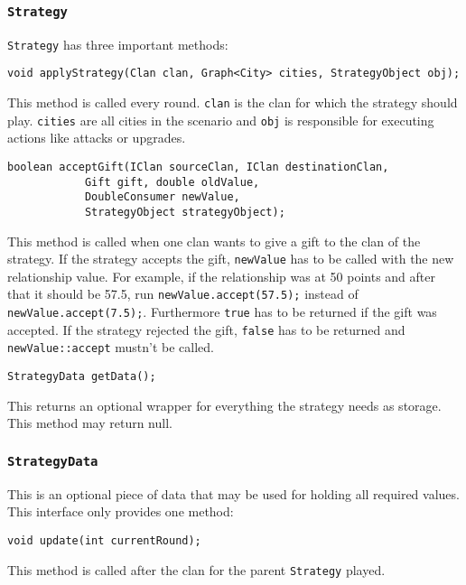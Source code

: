 \documentclass{article}
\begin{document}
\subsubsection{\texttt{Strategy}}
\texttt{Strategy} has three important methods:
\begin{verbatim}
void applyStrategy(Clan clan, Graph<City> cities, StrategyObject obj);
\end{verbatim}
This method is called every round. \texttt{clan} is the clan for which the strategy should play. \texttt{cities} are all cities in the scenario and  \texttt{obj} is responsible for executing
actions like attacks or upgrades.
\begin{verbatim}
boolean acceptGift(IClan sourceClan, IClan destinationClan,
			Gift gift, double oldValue,
			DoubleConsumer newValue,
			StrategyObject strategyObject);
\end{verbatim}
This method is called when one clan wants to give a gift to the clan of the strategy. If the strategy accepts the gift, \texttt{newValue} has to be called with the new relationship value. For example, if the relationship
was at 50 points and after that it should be 57.5, run \texttt{newValue.accept(57.5);} instead of \texttt{newValue.accept(7.5);}. Furthermore \texttt{true} has to be returned if the gift was accepted.
If the strategy rejected the gift, \texttt{false} has to be returned and \texttt{newValue::accept} mustn't be called.

\begin{verbatim}
StrategyData getData();
\end{verbatim}
This returns an optional wrapper for everything the strategy needs as storage. This method may return null.
\subsubsection{\texttt{StrategyData}}
This is an optional piece of data that may be used for holding all required values. This interface only provides one method:
\begin{verbatim}
void update(int currentRound);
\end{verbatim}
This method is called after the clan for the parent \texttt{Strategy} played.
\end{document}
